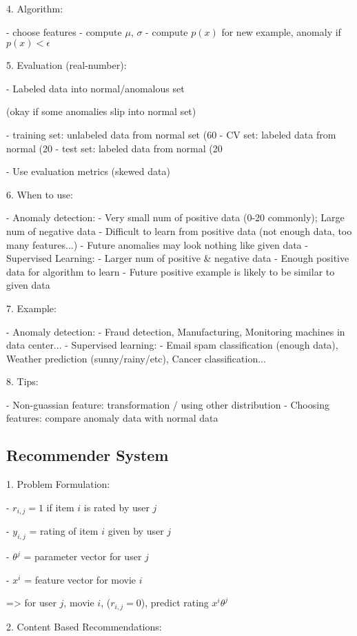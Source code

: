 4. Algorithm:

- choose features
- compute $\mu$, $\sigma$
- compute $p(x)$ for new example, anomaly if $p(x) < \epsilon $ 

5. Evaluation (real-number):

- Labeled data into normal/anomalous set

(okay if some anomalies slip into normal set)

- training set: unlabeled data from normal set (60%
- CV set: labeled data from normal (20%
- test set: labeled data from normal (20%

- Use evaluation metrics (skewed data)

6. When to use:

- Anomaly detection:
- Very small num of positive data (0-20 commonly); Large num of negative data
- Difficult to learn from positive data (not enough data, too many features...)
- Future anomalies may look nothing like given data
- Supervised Learning:
- Larger num of positive \& negative data
- Enough positive data for algorithm to learn
- Future positive example is likely to be similar to given data

7. Example:

- Anomaly detection:
- Fraud detection, Manufacturing, Monitoring machines in data center...
- Supervised learning:
- Email spam classification (enough data), Weather prediction (sunny/rainy/etc), Cancer classification...

8. Tips:

- Non-guassian feature: transformation / using other distribution
- Choosing features: compare anomaly data with normal data


\subsection{Recommender System}

1. Problem Formulation:

- $r_{i,j}=1$ if item $i$ is rated by user $j$ 

- $y_{i,j}$ = rating of item $i$ given by user $j$ 

- $\theta^j$ = parameter vector for user $j$ 

- $x^i$ = feature vector for movie $i$ 

=> for user $j$, movie $i$, ($r_{i,j}=0$), predict rating $x^i\theta^j$

2. Content Based Recommendations:

